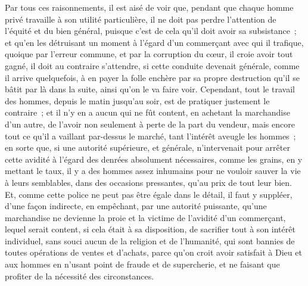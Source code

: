 \documentclass[french,twoside]{book} %
\begin{document}
Par tous ces raisonnements, il est aisé de voir que, pendant que chaque homme privé travaille à son utilité particulière, il ne doit pas perdre l’attention de l’équité et du bien général, puisque c’est de cela qu’il doit avoir sa subsistance ; et qu’en les détruisant un moment à l’égard d’un commerçant avec qui il trafique, quoique par l’erreur commune, et par la corruption du cœur, il croie avoir tout gagné, il doit au contraire s’attendre, si cette conduite devenait générale, comme il arrive quelquefois, à en payer la folle enchère par sa propre destruction qu’il se bâtit par là dans la suite, ainsi qu’on le va faire voir. Cependant, tout le travail des hommes, depuis le matin jusqu’au soir, est de pratiquer justement le contraire ; et il n’y en a aucun qui ne fût content, en achetant la marchandise d’un autre, de l’avoir non seulement à perte de la part du vendeur, mais encore tout ce qu’il a vaillant par-dessus le marché, tant l’intérêt aveugle les hommes ; en sorte que, si une autorité supérieure, et générale, n’intervenait pour arrêter cette avidité à l’égard des denrées absolument nécessaires, comme les grains, en y mettant le taux, il y a des hommes assez inhumains pour ne vouloir sauver la vie à leurs semblables, dans des occasions pressantes, qu’au prix de tout leur bien. Et, comme cette police ne peut pas être égale dans le détail, il faut y suppléer, d’une façon indirecte, en empêchant, par une autorité puissante, qu’une marchandise ne devienne la proie et la victime de l’avidité d’un commerçant, lequel serait content, si cela était à sa disposition, de sacrifier tout à son intérêt individuel, sans souci aucun de la religion et de l’humanité, qui sont bannies de toutes opérations de ventes et d’achats, parce qu’on croit avoir satisfait à Dieu et aux hommes en n’usant point de fraude et de supercherie, et ne faisant que profiter de la nécessité des circonstances.
\end{document}
